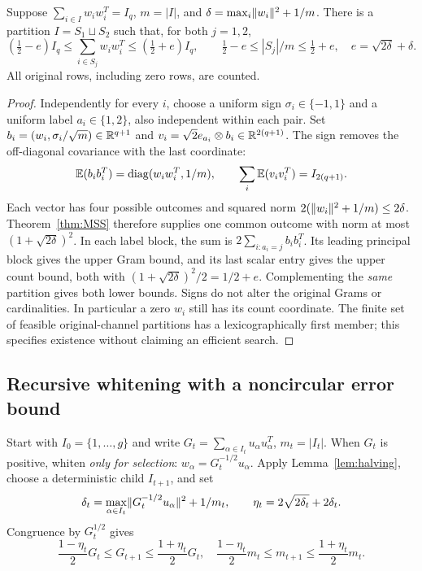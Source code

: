 \begin{lemma}\label{lem:halving}
Suppose $\sum_{i\in I}w_iw_i^T=I_q$, $m=|I|$, and
$\delta=\max_i\lVert w_i\rVert^2+1/m$. There is a partition $I=S_1\sqcup S_2$
such that, for both $j=1,2$,
\begin{equation}\label{eq:half}
 (\tfrac12-e)I_q\leq\sum_{i\in S_j}w_iw_i^T\leq(\tfrac12+e)I_q,
 \qquad \tfrac12-e\leq |S_j|/m\leq\tfrac12+e,
 \quad e=\sqrt{2\delta}+\delta.
\end{equation}
All original rows, including zero rows, are counted.
\end{lemma}
\begin{proof}
Independently for every $i$, choose a uniform sign $\sigma_i\in\{-1,1\}$
and a uniform label $a_i\in\{1,2\}$, also independent within each pair.
Set $b_i=(w_i,\sigma_i/\sqrt m)\in\mathbb R^{q+1}$ and
$v_i=\sqrt2 e_{a_i}\otimes b_i\in\mathbb R^{2(q+1)}$.
The sign removes the off-diagonal covariance with the last coordinate:
\[
 \mathbb E(b_ib_i^T)=\operatorname{diag}(w_iw_i^T,1/m),\qquad
 \sum_i\mathbb E(v_iv_i^T)=I_{2(q+1)}.
\]
Each vector has four possible outcomes and squared norm
$2(\lVert w_i\rVert^2+1/m)\leq2\delta$. Theorem~\ref{thm:MSS} therefore supplies
one common outcome with norm at most $(1+\sqrt{2\delta})^2$.
In each label block, the sum is $2\sum_{i:a_i=j}b_ib_i^T$.
Its leading principal block gives the upper Gram bound, and its last scalar
entry gives the upper count bound, both with
$(1+\sqrt{2\delta})^2/2=1/2+e$. Complementing the \emph{same} partition gives
both lower bounds. Signs do not alter the original Grams or cardinalities.
In particular a zero $w_i$ still has its count coordinate. The finite set of
feasible original-channel partitions has a lexicographically first member;
this specifies existence without claiming an efficient search.
\end{proof}

\subsection{Recursive whitening with a noncircular error bound}
Start with $I_0=\{1,\ldots,g\}$ and write
$G_t=\sum_{\alpha\in I_t}u_\alpha u_\alpha^T$, $m_t=|I_t|$.
When $G_t$ is positive, whiten \emph{only for selection}:
$w_\alpha=G_t^{-1/2}u_\alpha$. Apply Lemma~\ref{lem:halving}, choose a
deterministic child $I_{t+1}$, and set
\[
 \delta_t=\max_{\alpha\in I_t}\lVert G_t^{-1/2}u_\alpha\rVert^2+1/m_t,
 \qquad\eta_t=2\sqrt{2\delta_t}+2\delta_t.
\]
Congruence by $G_t^{1/2}$ gives
\begin{equation}\label{eq:recurrence}
 \frac{1-\eta_t}{2}G_t\leq G_{t+1}\leq\frac{1+\eta_t}{2}G_t,
 \quad\frac{1-\eta_t}{2}m_t\leq m_{t+1}\leq\frac{1+\eta_t}{2}m_t.
\end{equation}

